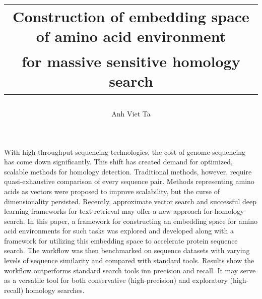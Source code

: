 \documentclass[twoside,a4paper]{master}
\begin{document}

\author{Anh Viet Ta}
\title{
       \begin{tabular}{c}
       \textbf{Construction of embedding space of amino acid environment}\\[3mm]
       \textbf{for massive sensitive homology search}
       \end{tabular}}
\Maketitle

\small
With high-throughput sequencing technologies, the cost of genome sequencing has come down significantly. This shift has created demand for optimized, scalable methods for homology detection. Traditional methods, however, require quasi-exhaustive comparison of every sequence pair. Methods representing amino acids as vectors were proposed to improve scalability, but the curse of dimensionality persisted. Recently, approximate vector search and successful deep learning frameworks for text retrieval may offer a new approach for homology search. In this paper, a framework for constructing an embedding space for amino acid environments for such tasks was explored and developed along with a framework for utilizing this embedding space to accelerate protein sequence search. The workflow was then benchmarked on sequence datasets with varying levels of sequence similarity and compared with standard tools. Results show the workflow outperforms standard search tools inn precision and recall. It may serve as a versatile tool for both conservative (high-precision) and exploratory (high-recall) homology searches.
\normalsize

\setcounter{tocdepth}{1}
\tableofcontents



\end{document}
